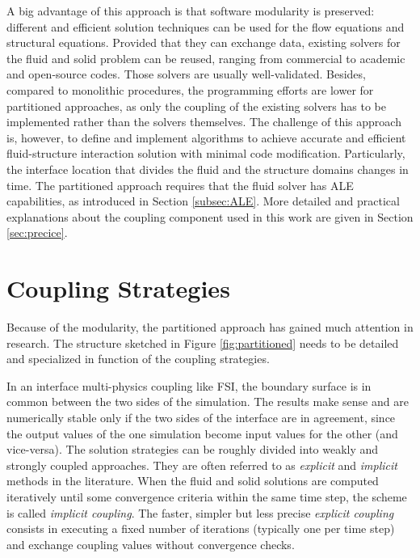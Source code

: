 A big advantage of this approach is that software modularity is preserved: different and efficient solution techniques can be used for the flow equations and structural equations. Provided that they can exchange data, existing solvers for the fluid and solid problem can be reused, ranging from commercial to academic and open-source codes. Those solvers are usually well-validated.
Besides, compared to monolithic procedures, the programming efforts are lower for partitioned approaches, as only the coupling of the existing solvers has to be implemented rather than the solvers themselves.
The challenge of this approach is, however, to define and implement algorithms to achieve accurate and efficient fluid-structure interaction solution with minimal code modification. Particularly, the interface
location that divides the fluid and the structure domains changes in time. The partitioned approach requires that the fluid solver has ALE capabilities, as introduced in Section \ref{subsec:ALE}.
More detailed and practical explanations about the coupling component used in this work are given in Section \ref{sec:precice}. 


\section{Coupling Strategies}
\label{sec:coupling}

Because of the modularity, the partitioned approach has gained much attention in research. The structure sketched in Figure \ref{fig:partitioned} needs to be detailed and specialized in function of the coupling strategies.

In an interface multi-physics coupling like FSI, the boundary surface is in common between the two sides of the simulation. The results make sense and are numerically stable only if the two sides of the interface are in agreement, since the output values of the one simulation become input values for the other (and vice-versa).
The solution strategies can be roughly divided into weakly and strongly coupled approaches. They are often referred to as \textit{explicit} and \textit{implicit} methods in the literature.
When the fluid and solid solutions are computed iteratively until some convergence criteria within the same time step, the scheme is called \textit{implicit coupling}. The faster, simpler but less precise \textit{explicit coupling} consists in executing a fixed number of iterations (typically one per time step) and exchange coupling values without convergence checks. 

